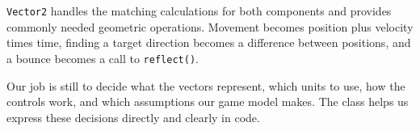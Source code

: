 \begin{hintbox}
	\texttt{Vector2} handles the matching calculations for both components and provides commonly needed	geometric operations. Movement becomes position plus velocity times time, finding a target direction becomes a difference between positions, and a bounce becomes a call to \texttt{reflect()}.
	
	Our job is still to decide what the vectors represent, which units to use, how the controls work, and which assumptions our game model makes. The class helps us express these decisions directly and clearly in code.
\end{hintbox}